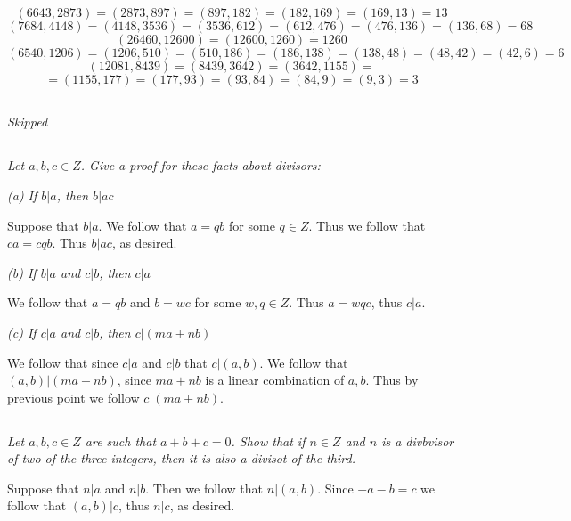 \documentclass[11pt,oneside,titlepage]{book}
\begin{document}
$$(6643, 2873) = (2873, 897) = (897, 182) = (182, 169) = (169, 13) = 13$$
$$(7684, 4148) = (4148, 3536) = (3536, 612) = (612, 476) = (476, 136) = (136, 68) = 68$$
$$(26460, 12600) = (12600, 1260) = 1260$$
$$(6540, 1206) = (1206, 510) = (510, 186) = (186, 138) = (138, 48) = (48, 42) = (42, 6) = 6$$
$$(12081, 8439) = (8439, 3642) = (3642, 1155) = $$
$$ = (1155, 177) = (177, 93) = (93, 84) = (84, 9) = (9, 3) = 3$$

\subsection{}
\subsection{}
\textit{Skipped}

\subsection{}

\textit{Let $a, b, c \in Z$. Give a proof for these facts about divisors:}

\textit{(a) If $b|a$, then $b|ac$}

Suppose that $b|a$. We follow that $a = qb$ for some $q \in Z$. Thus we follow that
$ca = cqb$. Thus $b|ac$, as desired.

\textit{(b) If $b|a$ and $c|b$, then $c|a$}

We follow that $a = qb$ and $b = wc$ for some $w, q \in Z$. Thus $a = wqc$, thus $c|a$.

\textit{(c) If $c|a$ and $c|b$, then $c|(ma + nb)$}

We follow that since $c|a$ and $c|b$ that $c|(a, b)$. We follow that $(a, b)|(ma + nb)$, since
$ma + nb$ is a linear combination of $a, b$. Thus by previous point we follow
$c | (ma + nb)$.

\subsection{}

\textit{Let $a, b, c \in Z$ are such that $a + b + c = 0$. Show that if $n \in Z$
  and $n$ is a divbvisor of two of the three integers, then it is also a divisot of the third.}

Suppose that $n|a$ and $n|b$. Then we follow that $n|(a, b)$. Since $-a - b = c$ we follow that
$(a, b) | c$, thus $n|c$, as desired.

\subsection{}
\end{document}
